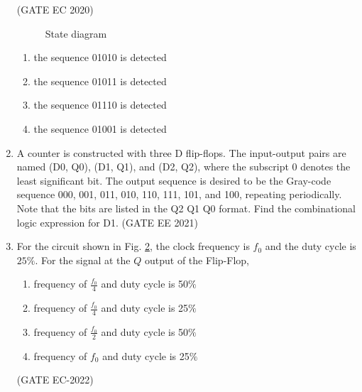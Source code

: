 \begin{enumerate}
\hfill (GATE EC 2020)
 \begin{figure}[h]
	 \centering
  
  \caption{State diagram}
  \label{fig:gate/ec/2020/39/1}		
  \end{figure}	 
\begin{enumerate}
 \item the sequence 01010 is detected
 \item the sequence 01011 is detected
 \item the sequence 01110 is detected
 \item the sequence 01001 is detected	 
\end{enumerate}	
	\item 		
		A counter is constructed with three D flip-flops. The input-output pairs are named (D0, Q0), (D1, Q1), and (D2, Q2), where the subscript 0 denotes the least significant bit. The output sequence is desired to be the Gray-code sequence 000, 001, 011, 010, 110, 111, 101, and 100, repeating periodically. Note that the bits are listed in the Q2 Q1 Q0 format. Find the combinational logic expression for D1.
\label{prob:2021-gate-ee-37}
\hfill (GATE EE 2021)

\item 
\label{prob:2022-gate-ec-43}
	 For the circuit shown in Fig. 
\ref{fig:2022-gate-ec-43},
		the clock frequency is $f_0$ and the duty cycle is $25 \%$. For the signal at the $Q$ output of the Flip-Flop,
\begin{enumerate}
	\item frequency of $\frac{f_0}{4}$ and duty cycle is 50$\%$
	\item frequency of $\frac{f_0}{4}$ and duty cycle is 25$\%$
	\item frequency of $\frac{f_0}{2}$ and duty cycle is 50$\%$
	\item frequency of $f_0$ and duty cycle is 25$\%$ \\
\end{enumerate}
\begin{figure}[h]
	\centering

	\caption{}
\label{fig:2022-gate-ec-43}
\end{figure}
\hfill 	(GATE EC-2022)
\end{enumerate}
